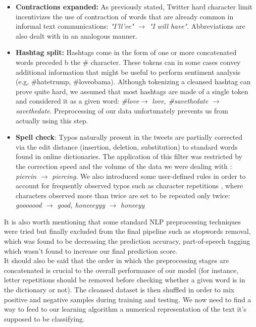 \documentclass[10pt,conference,compsocconf,retainorgcmds]{IEEEtran}
\begin{document}
\begin{itemize}[label={},leftmargin=*]
    \item \textbf{Contractions expanded:} As previously stated, Twitter hard character limit incentivizes the use of contraction of words that are already common in informal text communications: \textit{"I'll've" $\rightarrow$ "I will have"}. Abbreviations are also dealt with in an analogous manner.
    \item \textbf{Hashtag split:} Hashtags come in the form of one or more concatenated words preceded b the \# character. These tokens can in some cases convey additional information that might be useful to perform sentiment analysis (e.g, \#hatetrump, \#loveobama). Although tokenizing a cleansed hashtag can prove quite hard, we assumed that most hashtags are made of a single token and considered it as a given word:\textit{ \#love$\rightarrow$ love, \#savethedate $\rightarrow$ savethedate}. Preprocessing of our data unfortunately prevents us from actually using this step.
    
    \item \textbf{Spell check}: Typos naturally present in the tweets are partially corrected via the edit distance (insertion, deletion, substitution)  to standard words found in online dictionaries. The application of this filter was restricted by the correction speed and the volume of the data we were dealing with : \textit{piercin $\rightarrow$ piercing}. We also introduced some user-defined rules in order to account for frequently observed typos such as character repetitions , where characters observed more than twice are set to be repeated only twice: \textit{gooooood $\rightarrow$ good, honeeeyyy $\rightarrow$ honeeyy}
   \end{itemize}

It is also worth mentioning that some standard NLP preprocessing techniques were tried but finally excluded from the final pipeline such as stopwords removal, which was found to be decreasing the prediction accuracy, part-of-speech tagging which wasn't found to increase our final prediction score. \\
It should also be said that the order in which the preprocessing stages are concatenated is crucial to the overall performance of our model (for instance, letter repetitions should be removed before checking whether a given word is in the dictionary or not). The cleansed dataset is then shuffled in order to mix positive and negative samples during training and testing. We now need to find a way to feed to our learning algorithm a numerical representation of the text it's supposed to be classifying. 
\end{document}
